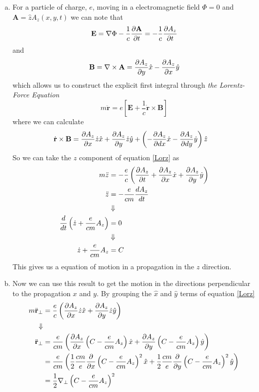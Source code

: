 \documentclass[11pt]{article}
\numberwithin{equation}{section}
\begin{document}
\begin{enumerate}[(a)]
\item For a particle of charge, $e$, moving in a electromagnetic field $\Phi = 0$ and 
$\mathbf{A}=\hat{z}A_{z}(x,y,t)$ we can note that 
$$\mathbf{E} = \bold\nabla\Phi-\frac{1}{c}\frac{\partial{\mathbf{A}}}{\partial{t}} = -\frac{1}{c}\frac{\partial{A_z}}{\partial{t}}$$
and
$$\mathbf{B} = \bold\nabla\times\mathbf{A} = \frac{\partial{A_z}}{\partial{y}}\hat{x} - \frac{\partial{A_z}}{\partial{x}}\hat{y}$$
which allows us to construct the explicit first integral through \emph{the Lorentz-Force 
Equation} 
\begin{equation}
m\ddot{\mathbf{r}} = e\left[\mathbf{E}+\frac{1}{c}\dot{\mathbf{r}}\times\mathbf{B}\right]
\label{Lorz}
\end{equation}
where we can calculate 
\begin{align*}
\dot{\mathbf{r}}\times\mathbf{B} &= \frac{\partial{A_z}}{\partial{x}}\dot{z}\hat{x} + \frac{\partial{A_z}}{\partial{y}}\dot{z}\hat{y} + \left(-\frac{\partial{A_z}}{\partial{dx}}\dot{x}-\frac{\partial{A_z}}{\partial{dy}}\dot{y}\right)\hat{z}
\end{align*}
So we can take the $z$ component of equation \ref{Lorz} as
\begin{align*}
m\ddot{z} &= -\frac{e}{c}\left(\frac{\partial{A_z}}{\partial{t}}+\frac{\partial{A_z}}{\partial{x}}\dot{x}+\frac{\partial{A_z}}{\partial{y}}\dot{y}\right)\\
\ddot{z} &= -\frac{e}{cm}\frac{dA_z}{dt}\\
&\Downarrow\\
\frac{d}{dt}\left(\dot{z} + \frac{e}{cm}A_z\right) &= 0\\
&\Downarrow\\
\dot{z} + \frac{e}{cm}A_z &= C
\end{align*}
This gives us a equation of motion in a propagation in the $z$ direction.

\item Now we can use this result to get the motion in the directions perpendicular to the 
propagation $x$ and $y$. By grouping the $\hat{x}$ and $\hat{y}$ terms of equation \ref{Lorz}
\begin{align*}
m\ddot{\mathbf{r}}_{\perp} &= \frac{e}{c}\left(\frac{\partial{A_z}}{\partial{x}}\dot{z}\hat{x} + \frac{\partial{A_z}}{\partial{y}}\dot{z}\hat{y}\right)\\
\Downarrow\\
\ddot{\mathbf{r}}_{\perp} &= \frac{e}{cm}\left(\frac{\partial{A_z}}{\partial{x}}\left(C-\frac{e}{cm}A_z\right)\hat{x} + \frac{\partial{A_z}}{\partial{y}}\left(C-\frac{e}{cm}A_z\right)\hat{y}\right)\\
&= \frac{e}{cm}\left(\frac{1}{2}\frac{cm}{e}\frac{\partial{}}{\partial{x}}\left(C-\frac{e}{cm}A_z\right)^2\hat{x} + \frac{1}{2}\frac{cm}{e}\frac{\partial{}}{\partial{y}}\left(C-\frac{e}{cm}A_z\right)^2\hat{y}\right)\\
&= \frac{1}{2}\bold\nabla_{\perp}\left(C-\frac{e}{cm}A_z\right)^2
\end{align*}


\end{enumerate}
\end{document}
